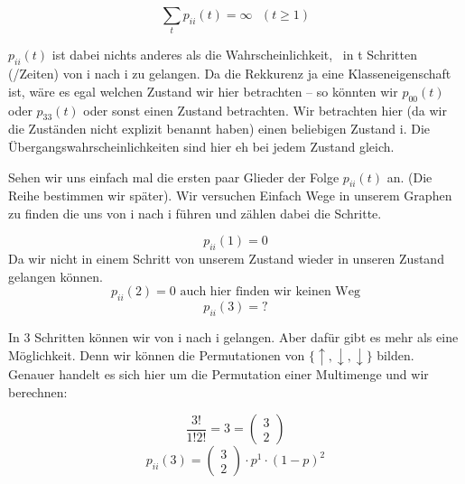 \begin{uebsp}
\begin{equation*}
\sum _{t}p_{\mathit{ii}}(t)=\infty \text{    }(t\ge 1)
\end{equation*}


{
 $p_{\mathit{ii}}(t)$ ist dabei nichts anderes als die
Wahrscheinlichkeit, \ in t Schritten (/Zeiten) von i nach i zu
gelangen. Da die Rekkurenz ja eine Klasseneigenschaft ist, w\"are es
egal welchen Zustand wir hier betrachten -- so k\"onnten wir 
$p_{00}(t)$ oder $p_{33}(t)$ oder sonst einen Zustand betrachten. Wir
betrachten hier (da wir die Zust\"anden nicht explizit benannt haben)
einen beliebigen Zustand i. Die \"Ubergangswahrscheinlichkeiten sind
hier eh bei jedem Zustand gleich.}



{
Sehen wir uns einfach mal die ersten paar Glieder der Folge 
$p_{\mathit{ii}}(t)$  an. (Die Reihe bestimmen wir sp\"ater). Wir
versuchen Einfach Wege in unserem Graphen zu finden die uns von i nach
i f\"uhren und z\"ahlen dabei die Schritte.}



\begin{equation*}
p_{\mathit{ii}}(1)=0
\end{equation*}
Da wir nicht in einem Schritt von unserem
Zustand wieder in unseren Zustand gelangen k\"onnen.
\begin{equation*}
p_{\mathit{ii}}(2)=0\text{ auch hier finden wir keinen Weg}
\end{equation*}
\begin{equation*}
p_{\mathit{ii}}(3)=?
\end{equation*}


{
In 3 Schritten k\"onnen wir von i nach i gelangen. Aber daf\"ur gibt es
mehr als eine M\"oglichkeit. Denn wir k\"onnen die Permutationen von 
$\{\uparrow ,\downarrow ,\downarrow \}$ bilden. Genauer handelt es sich
hier um die Permutation einer Multimenge und wir berechnen:}



\begin{equation*}
\frac{3!}{1!2!}=3=\left(\begin{matrix}3\\2\end{matrix}\right)
\end{equation*}
\begin{equation*}
p_{\mathit{ii}}(3)=\left(\begin{matrix}3\\2\end{matrix}\right)\cdot
p^{1}\cdot (1-p)^{2}
\end{equation*}


\end{uebsp}
